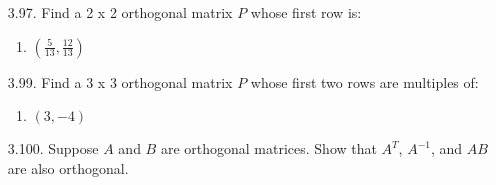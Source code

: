 \documentclass[12pt]{article}
\begin{document}
\begin{enumerate}
\begin{enumerate}
	
	\item $A^2$
	\begin{proof}
	Assume that $A$ is symmetric, then $A=A^T$. We show that $A^2=(A^2)^T$.\\
	Note that $A^2 = A*A$. Since $A$ is symmetric, then $A*A=A^T*A^T$ and by the distributive law,$A^T*A^T=(A*A)^T=(A^2)^T$.
	\end{proof}	
	
	\end{enumerate}


\item [3.97.] Find a 2 x 2 orthogonal matrix $P$ whose first row is:
	\begin{enumerate}
	\item $(\frac{5}{13}, \frac{12}{13})$\\

	\end{enumerate}


\item [3.99.] Find a 3 x 3 orthogonal matrix $P$ whose first two rows are multiples of:
	\begin{enumerate}
	\item $(3, -4)$\\

	\end{enumerate}


\item [3.100.] Suppose $A$ and $B$ are orthogonal matrices. Show that $A^T$, $A^{-1}$, and $AB$ are also orthogonal.\\
\end{enumerate}
\end{document}
